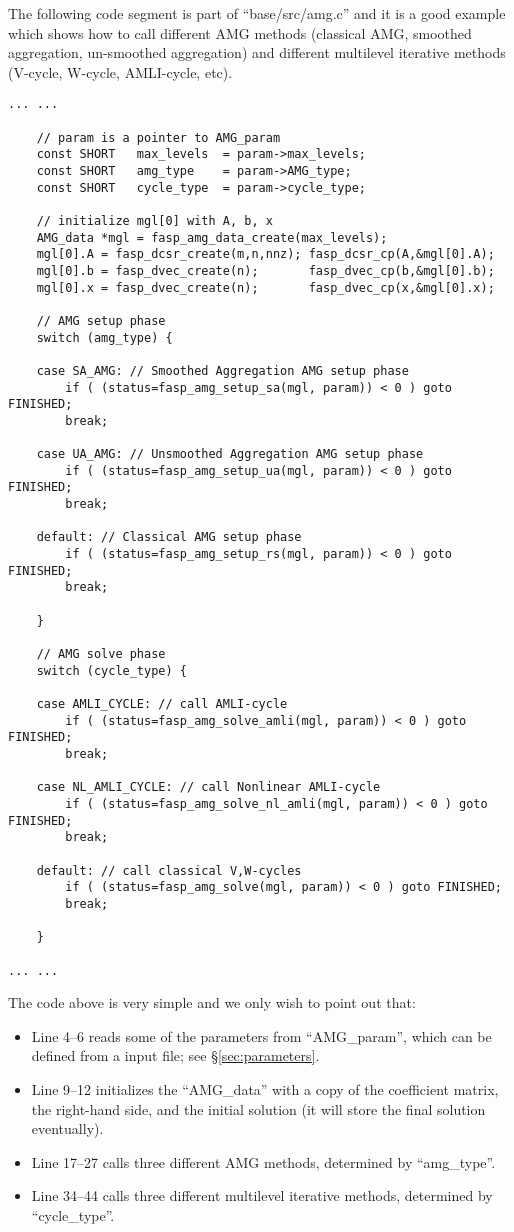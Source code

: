 \documentclass[11pt]{memoir}
\begin{document}
The following code segment is part of ``base/src/amg.c'' and it is a good example which shows how to call different AMG methods (classical AMG, smoothed aggregation, un-smoothed aggregation) and different multilevel iterative methods (V-cycle, W-cycle, AMLI-cycle, etc).
%
\begin{lstlisting}
... ...

    // param is a pointer to AMG_param
    const SHORT   max_levels  = param->max_levels;
    const SHORT   amg_type    = param->AMG_type;
    const SHORT   cycle_type  = param->cycle_type;

    // initialize mgl[0] with A, b, x
    AMG_data *mgl = fasp_amg_data_create(max_levels);
    mgl[0].A = fasp_dcsr_create(m,n,nnz); fasp_dcsr_cp(A,&mgl[0].A);
    mgl[0].b = fasp_dvec_create(n);       fasp_dvec_cp(b,&mgl[0].b);
    mgl[0].x = fasp_dvec_create(n);       fasp_dvec_cp(x,&mgl[0].x);

    // AMG setup phase
    switch (amg_type) {

    case SA_AMG: // Smoothed Aggregation AMG setup phase
        if ( (status=fasp_amg_setup_sa(mgl, param)) < 0 ) goto FINISHED;
        break;

    case UA_AMG: // Unsmoothed Aggregation AMG setup phase
        if ( (status=fasp_amg_setup_ua(mgl, param)) < 0 ) goto FINISHED;
        break;

    default: // Classical AMG setup phase
        if ( (status=fasp_amg_setup_rs(mgl, param)) < 0 ) goto FINISHED;
        break;

    }

    // AMG solve phase
    switch (cycle_type) {

    case AMLI_CYCLE: // call AMLI-cycle
        if ( (status=fasp_amg_solve_amli(mgl, param)) < 0 ) goto FINISHED;
        break;

    case NL_AMLI_CYCLE: // call Nonlinear AMLI-cycle
        if ( (status=fasp_amg_solve_nl_amli(mgl, param)) < 0 ) goto FINISHED;
        break;

    default: // call classical V,W-cycles
        if ( (status=fasp_amg_solve(mgl, param)) < 0 ) goto FINISHED;
        break;

    }

... ...
\end{lstlisting}
%
The code above is very simple and we only wish to point out that:
%
\begin{itemize}
\item Line 4--6 reads some of the parameters from ``AMG\_param'', which can be defined from a input file; see \S\ref{sec:parameters}.
\item Line 9--12 initializes the ``AMG\_data'' with a copy of the coefficient matrix, the right-hand side, and the initial solution (it will store the final solution eventually).
\item Line 17--27 calls three different AMG methods, determined by ``amg\_type''.
\item Line 34--44 calls three different multilevel iterative methods, determined by ``cycle\_type''.
\end{itemize}
\end{document}
